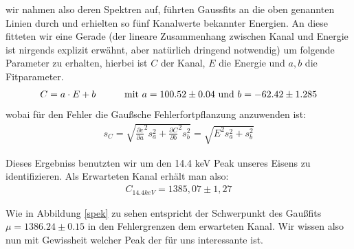 \documentclass[12pt]{article}
\begin{document}
wir nahmen also deren Spektren auf, führten Gaussfits an die oben genannten Linien durch und erhielten so fünf Kanalwerte bekannter Energien. An diese fitteten 
wir eine Gerade (der lineare Zusammenhang zwischen Kanal und Energie ist nirgends explizit erwähnt, aber natürlich dringend notwendig) um folgende Parameter
zu erhalten, hierbei ist $C$ der Kanal, $E$ die Energie und $a,b$ die Fitparameter.
\begin{align*}
  C = a \cdot E + b \hspace{30pt} \textnormal{mit }a = 100.52 \pm 0.04\textnormal{ und }b =  -62.42 \pm 1.285
\end{align*}
wobai für den Fehler die Gaußsche Fehlerfortpflanzung anzuwenden ist:
\begin{align*}
  s_C = \sqrt{\frac{\partial{c}}{\partial{a}}^2 s_a^2 + \frac{\partial{C}}{\partial{b}}^2 s_b^2 } = \sqrt{E^2 s_a^2 + s_b^2}
\end{align*}

Dieses Ergebniss benutzten wir um den 14.4 keV Peak unseres Eisens zu identifizieren. Als Erwarteten Kanal erhält man also:
\begin{align*}
  C_{14.4keV} = 1385,07 \pm 1,27
\end{align*}

Wie in Abbildung \ref{spek} zu sehen entspricht der Schwerpunkt des Gaußfits $\mu=1386.24\pm0.15$ in den Fehlergrenzen dem erwarteten Kanal. Wir wissen also nun mit Gewissheit
welcher Peak der für uns interessante ist.
\end{document}
